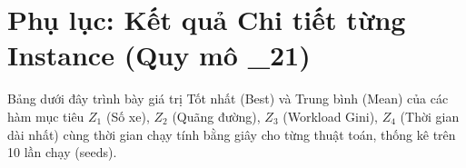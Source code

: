 \documentclass[11pt,a4paper]{article}
\begin{document}
\section*{Phụ lục: Kết quả Chi tiết từng Instance (Quy mô \_21)}
Bảng dưới đây trình bày giá trị Tốt nhất (Best) và Trung bình (Mean) của các hàm mục tiêu $Z_1$ (Số xe), $Z_2$ (Quãng đường), $Z_3$ (Workload Gini), $Z_4$ (Thời gian dài nhất) cùng thời gian chạy tính bằng giây cho từng thuật toán, thống kê trên 10 lần chạy (seeds).

\small

\normalsize
\end{document}
